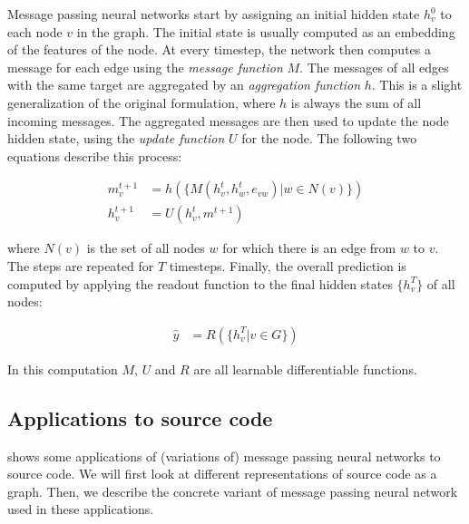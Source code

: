 \documentclass[sigconf,authordraft=true,nonacm=true]{acmart}
\begin{document}
Message passing neural networks start by assigning an initial hidden state $h^0_v$ to each node $v$ in the graph.
The initial state is usually computed as an embedding of the features of the node.
At every timestep, the network then computes a message for each edge using the \textit{message function} $M$.
The messages of all edges with the same target are aggregated by an \textit{aggregation function} $h$.
This is a slight generalization of the original formulation, where $h$ is always the sum of all incoming messages.
The aggregated messages are then used to update the node hidden state, using the \textit{update function} $U$ for the node.
The following two equations describe this process:

\begin{align}
  m^{t+1}_{v} & = h(\{M(h^{t}_{v},h^{t}_{w},e_{vw}) | w \in N(v)\}) \label{eq:msg} \\
  h^{t+1}_{v} & = U(h^{t}_{v}, m^{t+1}) \label{eq:update}
\end{align}

where $N(v)$ is the set of all nodes $w$ for which there is an edge from $w$ to $v$.
The steps are repeated for $T$ timesteps. Finally, the overall prediction is computed by applying the readout function to the final hidden states $\{h^{T}_{v}\}$ of all nodes:

\begin{align}
  \hat{y} &= R(\{h^{T}_{v} | v \in G\}) \label{eq:readout}
\end{align}

In this computation $M$, $U$ and $R$ are all learnable differentiable functions.

\subsection{Applications to source code}\label{sec:app}
 shows some applications of (variations of) message passing neural networks to source code.
We will first look at different representations of source code as a graph.
Then, we describe the concrete variant of message passing neural network used in these applications.
\end{document}
